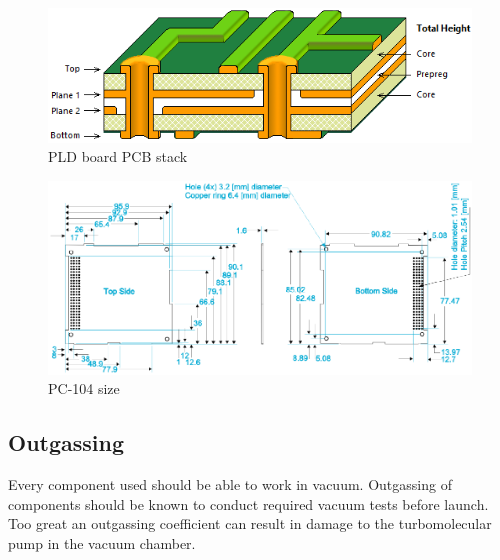         \begin{figure}[H]
            \centering
            \includegraphics[width=0.5\paperwidth]{img/PLD_PCB_stack.png}
            \caption{PLD board PCB stack}
            \label{PLD_PCB_stack}
        \end{figure}

        \begin{figure}[H]
            \centering
            \includegraphics[width=0.7\paperwidth]{img/PC104_PLD_size.png}
            \caption{PC-104 size}
            \label{PLD_PCB_size}
        \end{figure}



    \subsection{Outgassing}
        Every component used should be able to work in vacuum. Outgassing of components should be known to conduct required vacuum tests before launch. Too great an outgassing coefficient can result in damage to the turbomolecular pump in the vacuum chamber.

